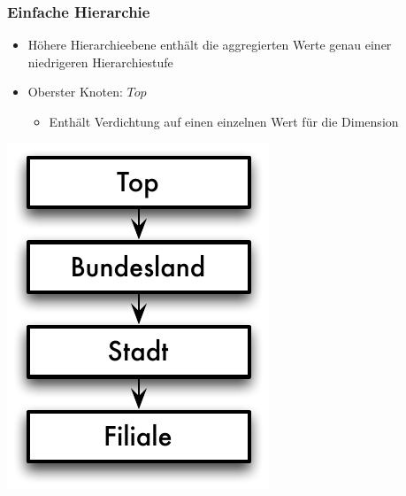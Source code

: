         \begin{frame}

        \frametitle{Einfache Hierarchie}
        \begin{itemize}
        \item Höhere Hierarchieebene enthält die aggregierten Werte genau
          einer niedrigeren Hierarchiestufe
        \item Oberster Knoten: $Top$
          \begin{itemize}
          \item
            Enthält Verdichtung auf einen einzelnen Wert für die Dimension
          \end{itemize}
        \end{itemize}

        \begin{center}
        \includegraphics[scale=.46]{fig6/Einfache-Hierarchien.pdf}
        \end{center}
        \end{frame}

